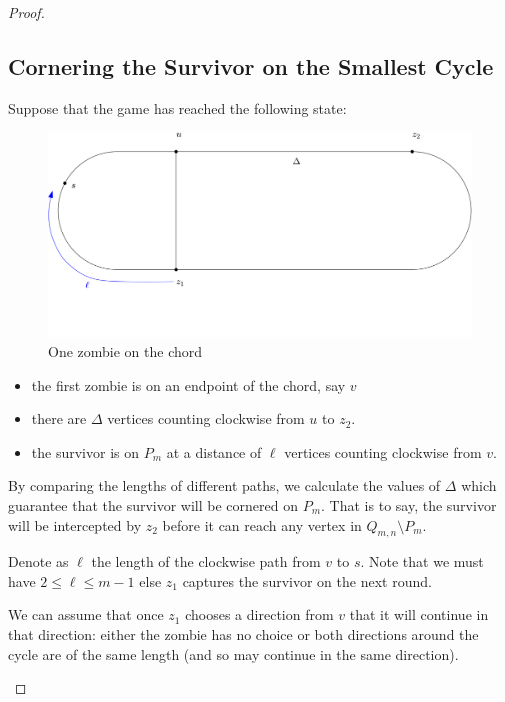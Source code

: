 \begin{proof}
 \newpage

 \subsection{Cornering the Survivor on the Smallest Cycle}

\begin{proofpart}
   Suppose that the game has reached the following state:

  \begin{figure}
    \centering
    \includegraphics[scale=0.20]{q_m_n/diagram1}
    \caption{One zombie on the chord \label{fig:onthechord}}
  \end{figure}

  \begin{itemize}
   \item the first zombie is on an endpoint of the chord, say $v$
   \item there are $\Delta$ vertices counting clockwise from $u$ to $z_2$.
   \item the survivor is on $P_m$ at a distance of $\ell$ vertices counting
   clockwise from $v$.
  \end{itemize}

  By comparing the lengths of different paths, we calculate the values of $\Delta$
  which guarantee that the survivor will be cornered on $P_m$. That is to say,
  the survivor will be intercepted by $z_2$ before it can reach any vertex
  in $Q_{m,n} \setminus P_m$.

  Denote as $\ell$ the length of the clockwise
  path from $v$ to $s$. Note that we must have $2 \leq \ell \leq m-1$ else
  $z_1$ captures the survivor on the next round.

  We can assume that once $z_1$ chooses a direction from $v$
  that it will continue in that direction:
  either the zombie has no choice or both directions around
  the cycle are of the same length (and so
  may continue in the same direction).


\end{proofpart}
\end{proof}
